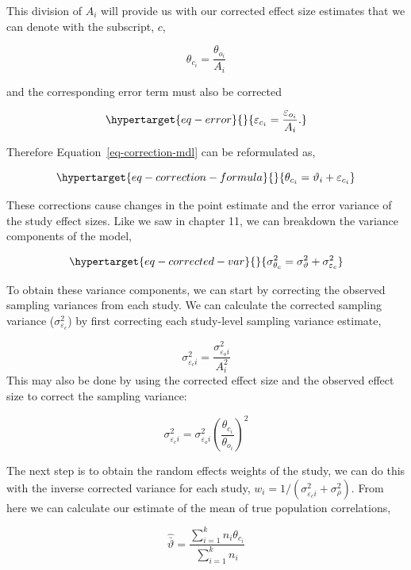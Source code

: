 \documentclass[
  letterpaper,
  DIV=11,
  numbers=noendperiod]{scrreprt}
\begin{document}
This division of \(A_i\) will provide us with our corrected effect size
estimates that we can denote with the subscript, \(c\),

\[
\theta_{c_i} = \frac{\theta_{o_i}}{A_i}
\]

and the corresponding error term must also be corrected

\begin{equation}\protect\hypertarget{eq-error}{}{
\varepsilon_{c_i} = \frac{\varepsilon_{o_i}}{A_i}.
}\label{eq-error}\end{equation}

Therefore Equation~\ref{eq-correction-mdl} can be reformulated as,

\begin{equation}\protect\hypertarget{eq-correction-formula}{}{
\theta_{c_i} = \vartheta_i + \varepsilon_{c_i} 
}\label{eq-correction-formula}\end{equation}

These corrections cause changes in the point estimate and the error
variance of the study effect sizes. Like we saw in chapter 11, we can
breakdown the variance components of the model,

\begin{equation}\protect\hypertarget{eq-corrected-var}{}{
\sigma^2_{\theta_c} = \sigma^2_{\vartheta} + \sigma^2_{\varepsilon_c}
}\label{eq-corrected-var}\end{equation}

To obtain these variance components, we can start by correcting the
observed sampling variances from each study. We can calculate the
corrected sampling variance (\(\sigma^2_{\varepsilon_c}\)) by first
correcting each study-level sampling variance estimate,

\[
\sigma^2_{\varepsilon_ci} = \frac{\sigma^2_{\varepsilon_oi}}{A^2_i}
\] This may also be done by using the corrected effect size and the
observed effect size to correct the sampling variance:

\[
\sigma^2_{\varepsilon_ci} = \sigma^2_{\varepsilon_oi} \left(\frac{\theta_{c_i}}{\theta_{o_i}}\right)^2
\]

The next step is to obtain the random effects weights of the study, we
can do this with the inverse corrected variance for each study,
\(w_i=1/(\sigma^2_{\varepsilon_ci}+\sigma^2_\rho)\). From here we can
calculate our estimate of the mean of true population correlations,

\[
\hat{\bar{\vartheta}}=\frac{\sum^k_{i=1}n_i\theta_{c_i}}{\sum^k_{i=1}n_i}
\]
\end{document}

